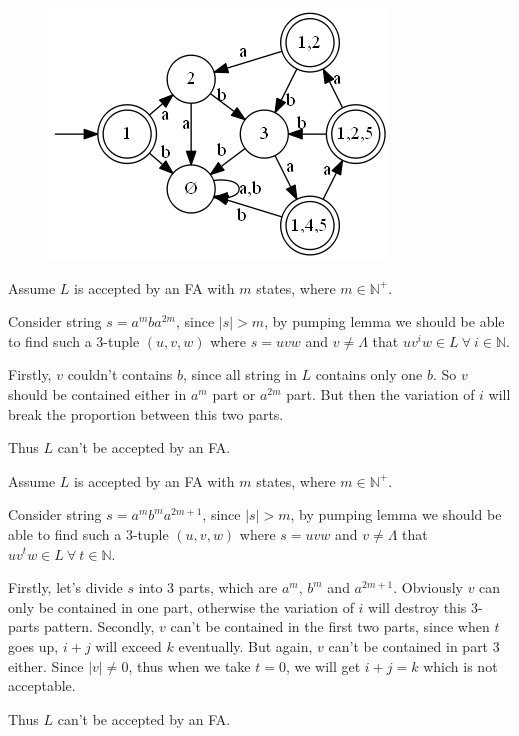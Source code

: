 \documentclass{article}
\begin{document}
\begin{tlist}{10}
	\begin{figure}[H]\centering\includegraphics[scale=.6]{g2.png}\end{figure}
	\item[2.22 (a)]
	\begin{tlist}{2}
		\item[$\bullet$]
		Assume $L$ is accepted by an FA with $m$ states, where $m\in\mathbb{N}^+$.
		\item[$\bullet$]
		Consider string $s=a^mba^{2m}$, since $|s|>m$, by pumping lemma we should be able to find such a 3-tuple $(u,v,w)$ where $s=uvw$ and $v\neq\Lambda$ that $uv^iw\in L\ \forall\ i\in\mathbb{N}$.
		\item[$\bullet$]
		Firstly, $v$ couldn't contains $b$, since all string in $L$ contains only one $b$. So $v$ should be contained either in $a^m$ part or $a^{2m}$ part. But then the variation of $i$ will break the proportion between this two parts.
		\item[$\bullet$]
		Thus $L$ can't be accepted by an FA.
	\end{tlist}
	\item[2.22 (b)]
	\begin{tlist}{2}
		\item[$\bullet$]
		Assume $L$ is accepted by an FA with $m$ states, where $m\in\mathbb{N}^+$.
		\item[$\bullet$]
		Consider string $s=a^mb^ma^{2m+1}$, since $|s|>m$, by pumping lemma we should be able to find such a 3-tuple $(u,v,w)$ where $s=uvw$ and $v\neq\Lambda$ that $uv^tw\in L\ \forall\ t\in\mathbb{N}$.
		\item[$\bullet$]
		Firstly, let's divide $s$ into 3 parts, which are $a^m$, $b^m$ and $a^{2m+1}$. Obviously $v$ can only be contained in one part, otherwise the variation of $i$ will destroy this 3-parts pattern. Secondly, $v$ can't be contained in the first two parts, since when $t$ goes up, $i+j$ will exceed $k$ eventually. But again, $v$ can't be contained in part 3 either. Since $|v|\neq 0$, thus when we take $t=0$, we will get $i+j=k$ which is not acceptable.
		\item[$\bullet$]
		Thus $L$ can't be accepted by an FA.
	\end{tlist}
\end{tlist}
\end{document}
